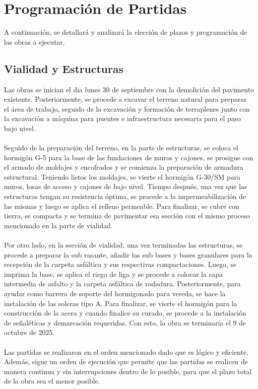 \section{Programación de Partidas}

A continuación, se detallará y analizará la elección de plazos y programación de las obras a ejecutar.

\subsection{Vialidad y Estructuras}

Las obras se inician el dia lunes 30 de septiembre con la demolición del
pavimento existente. Posteriormente, se procede a excavar el terreno natural
para preparar el área de trabajo, seguido de la excavación y formación de
terraplenes junto con la excavación a máquina para puentes e infraestructura
necesaria para el paso bajo nivel. 
\\\\
Seguido de la preparación del terreno, en la parte de estructuras, se coloca el hormigón G-5 
para la base de las fundaciones de muros y cajones, se prosigue con el armado de moldajes y 
encofrados y se comienza la preparación de armadura estructural. Teniendo listos los moldajes, 
se vierte el hormigón G-30/SM para muros, losas de acceso y cajones de bajo nivel. Tiempo después, 
una vez que las estructuras tengan su resistencia óptima, se procede a la impermeabilización de las 
mismas y luego se aplica el relleno permeable. Para finalizar, se cubre con tierra, se compacta 
y se termina de pavimentar esa sección con el mismo proceso mencionado en la parte de vialidad.
\\\\
Por otro lado, en la sección de vialidad, una vez terminadas las estructuras, se procede
a preparar la sub rasante, añadir las sub bases y bases granulares para la recepción de 
la carpeta asfáltica y sus respectivas compactaciones. Luego, se imprima la base, se
aplica el riego de liga y se procede a colocar la capa intermedia de asfalto y 
la carpeta asfáltica de rodadura. Posteriormente, para ayudar como barrera de soporte del 
hormigonado para vereda, se hace la instalación de las soleras tipo A. Para finalizar, se vierte el
hormigón para la construcción de la acera y cuando finalice su curado, se procede a la 
instalación de señaléticas y demarcación requeridas. Con esto, la obra se terminaría el 9 de octubre de 2025.
\\\\
Las partidas se realizaron en el orden mencionado dado que es lógico y eficiente. Además, sigue un
orden de ejecución que permite que las partidas se realicen de manera continua y sin interrupciones
dentro de lo posible, para que el plazo total de la obra sea el menor posible.

